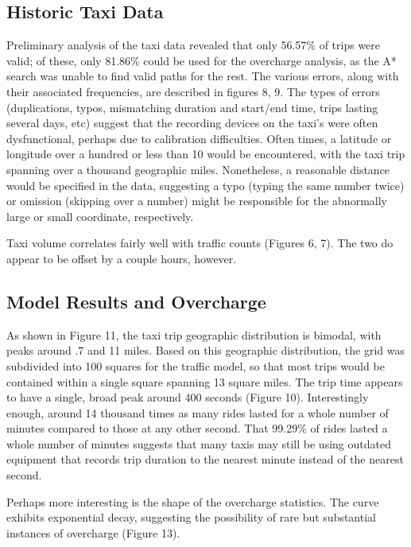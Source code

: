 \documentclass{sig-alternate}
\begin{document}
\subsection{Historic Taxi Data}

Preliminary analysis of the taxi data revealed that only 56.57\% of trips were valid; of these, only 81.86\% could be used for the overcharge analysis, as the A* search was unable to find valid paths for the rest. The various errors, along with their associated frequencies, are described in figures 8, 9. The types of errors (duplications, typos, mismatching duration and start/end time, trips lasting several days, etc) suggest that the recording devices on the taxi's were often dysfunctional, perhaps due to calibration difficulties. Often times, a latitude or longitude over a hundred or less than 10 would be encountered, with the taxi trip spanning over a thousand geographic miles. Nonetheless, a reasonable distance would be specified in the data, suggesting a typo (typing the same number twice) or omission (skipping over a number) might be responsible for the abnormally large or small coordinate, respectively.

Taxi volume correlates fairly well with traffic counts (Figures 6, 7). The two do appear to be offset by a couple hours, however.

\subsection{Model Results and Overcharge}



As shown in Figure 11, the taxi trip geographic distribution is bimodal, with peaks around .7 and 11 miles. Based on this geographic distribution, the grid was subdivided into 100 squares for the traffic model, so that most trips would be contained within a single square spanning 13 square miles. The trip time appears to have a single, broad peak around 400 seconds (Figure 10). Interestingly enough, around 14 thousand times as many rides lasted for a whole number of minutes compared to those at any other second. That 99.29\% of rides lasted a whole number of minutes suggests that many taxis may still be using outdated equipment that records trip duration to the nearest minute instead of the nearest second.

Perhaps more interesting is the shape of the overcharge statistics. The curve exhibits exponential decay, suggesting the possibility of rare but substantial instances of overcharge (Figure 13).
\end{document}
